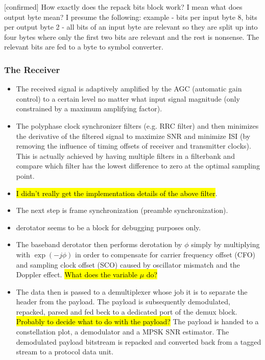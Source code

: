 \documentclass{article}
\begin{document}
\color{red}
[confirmed] How exactly does the repack bits block work? I mean what does output byte mean? I presume the following: example - bits per input byte 8, bits per output byte 2 - all bits of an input byte are relevant so they are split up into four bytes where only the first two bits are relevant and the rest is nonsense. The relevant bits are fed to a byte to symbol converter.
\color{black}

\subsubsection{The Receiver}

\begin{itemize}
	\item The received signal is adaptively amplified by the AGC (automatic gain control) to a certain level no matter what input signal magnitude (only constrained by a maximum amplifying factor).
	\item The polyphase clock synchronizer filters (e.g. RRC filter) and then minimizes the derivative of the filtered signal to maximize SNR and minimize ISI (by removing the influence of timing offsets of receiver and transmitter clocks). This is actually achieved by having multiple filters in a filterbank and compare which filter has the lowest difference to zero at the optimal sampling point.
	\item \hl{I didn't really get the implementation details of the above filter}.
	\item The next step is frame synchronization (preamble synchronization).
	\item  derotator seems to be a block for debugging purposes only.
	\item  The baseband derotator then performs derotation by $\phi$ simply by multiplying with $\exp(-j\phi)$ in order to compensate for carrier frequency offset (CFO) and sampling clock offset (SCO) caused by oscillator mismatch and the Doppler effect. \hl{What does the variable $\mu$ do?}
	\item The data then is passed to a demultiplexer whose job it is to separate the header from the payload. The payload is subsequently demodulated, repacked, parsed and fed beck to a dedicated port of the demux block. \hl{Probably to decide what to do with the payload?} The payload is handed to a constellation plot, a demodulator and a MPSK SNR estimator. The demodulated payload bitstream is repacked and converted back from a tagged stream to a protocol data unit.
\end{itemize}
\end{document}
